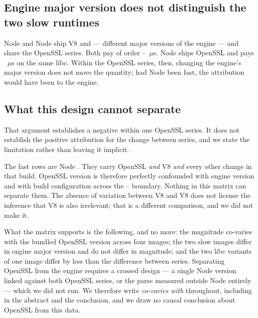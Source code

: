 \documentclass[pdflatex,sn-basic,twocolumn]{sn-jnl}%
\begin{document}
\subsection{Engine major version does not distinguish the two slow runtimes}

Node \NodeEighteenNodeMajor{} and Node \NodeTwentyNodeMajor{} ship V8
\NodeEighteenVeight{} and \NodeTwentyVeight{} --- different major versions of the
engine --- and share the OpenSSL \NodeEighteenOpensslSeries{} series. Both pay of
order \NodeEighteenProbeThrows--\NodeTwentyProbeThrows~$\mu$s. Node
\NodeTwentySixMuslNodeMajor{} ships OpenSSL \NodeTwentySixMuslOpensslSeries{} and
pays \NodeTwentySixMuslProbeThrows~$\mu$s on the same libc. Within the OpenSSL
\NodeEighteenOpensslSeries{} series, then, changing the engine's major version
does not move the quantity; had Node \NodeTwentyNodeMajor{} been fast, the
attribution would have been to the engine.

\subsection{What this design cannot separate}\label{sec:cannot-separate}

That argument establishes a negative within one OpenSSL series. It does not
establish the positive attribution for the change between series, and we state
the limitation rather than leaving it implicit.

The fast rows are Node \NodeTwentySixMuslNodeMajor. They carry OpenSSL
\NodeTwentySixMuslOpensslSeries{} \emph{and} V8 \NodeTwentySixMuslVeight{}
\emph{and} every other change in that build. OpenSSL version is therefore
perfectly confounded with engine version and with build configuration across the
\NodeEighteenOpensslSeries--\NodeTwentySixMuslOpensslSeries{} boundary. Nothing
in this matrix can separate them. The absence of variation between V8
\NodeEighteenVeight{} and V8 \NodeTwentyVeight{} does not license the inference
that V8 \NodeTwentySixMuslVeight{} is also irrelevant; that is a different
comparison, and we did not make it.

What the matrix supports is the following, and no more: the magnitude co-varies
with the bundled OpenSSL version across four images; the two slow images differ
in engine major version and do not differ in magnitude; and the two libc variants
of one image differ by less than the difference between series. Separating
OpenSSL from the engine requires a crossed design --- a single Node version
linked against both OpenSSL series, or the parse measured outside Node entirely
--- which we did not run. We therefore write \emph{co-varies with} throughout,
including in the abstract and the conclusion, and we draw no causal conclusion
about OpenSSL from this data.
\end{document}
